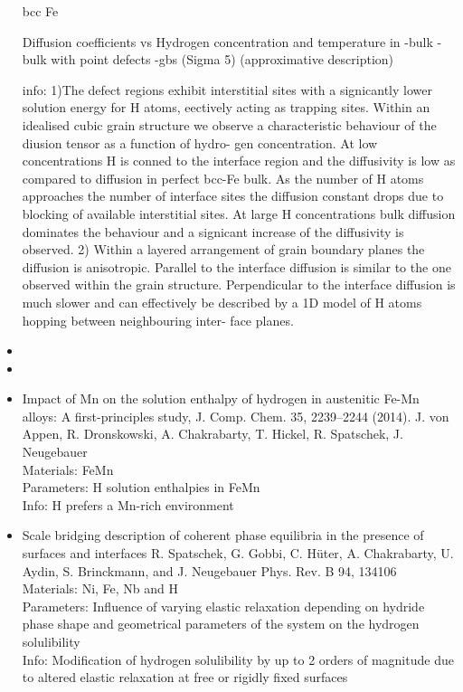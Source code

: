 \documentclass[11pt,floatfix,showpacs]{amsart}
\begin{document}
\begin{itemize}
bcc Fe

Diffusion coefficients vs Hydrogen concentration and temperature in 
-bulk
-bulk with point defects 
-gbs (Sigma 5)
 (approximative description)

info: 
1)The defect regions exhibit interstitial sites with a signicantly lower solution energy for
H atoms, eectively acting as trapping sites. Within an idealised cubic grain structure we observe a characteristic behaviour of the diusion tensor as a function of hydro-
gen concentration. At low concentrations H is conned to the interface region and the diffusivity is low as compared to diffusion in perfect bcc-Fe bulk. As the number
of H atoms approaches the number of interface sites the diffusion constant drops due to blocking of available interstitial sites. At large H concentrations bulk diffusion
dominates the behaviour and a signicant increase of the diffusivity is observed.
2) Within a layered arrangement of grain boundary planes the diffusion is anisotropic. Parallel to the interface diffusion is similar to the one observed within the grain structure. Perpendicular to the interface diffusion is much slower and can effectively be described by a 1D model of H atoms hopping between neighbouring inter-
face planes.

\item
\item
\item Impact of Mn on the solution enthalpy of hydrogen in austenitic Fe-Mn alloys: A first-principles study,
J. Comp. Chem. 35, 2239–2244 (2014).
J. von Appen, R. Dronskowski, A. Chakrabarty, T. Hickel, R. Spatschek, J. Neugebauer\\
Materials: FeMn\\
Parameters: H solution enthalpies in FeMn \\
Info: H prefers a Mn-rich environment

\item Scale bridging description of coherent phase equilibria in the presence of surfaces and interfaces
R. Spatschek, G. Gobbi, C. Hüter, A. Chakrabarty, U. Aydin, S. Brinckmann, and J. Neugebauer
Phys. Rev. B 94, 134106\\
Materials: Ni, Fe, Nb and H \\
Parameters: Influence of varying elastic relaxation depending on hydride phase shape and geometrical parameters of the system on the hydrogen solulibility \\
Info: Modification of hydrogen solulibility by up to 2 orders of magnitude due to altered elastic relaxation at free or rigidly fixed surfaces


\end{itemize}
\end{document}
